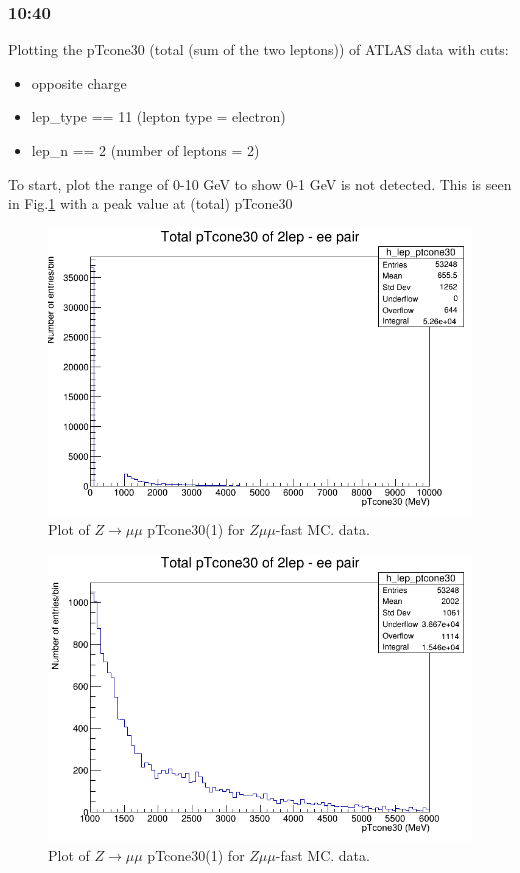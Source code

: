 \subsubsection*{10:40}
Plotting the pTcone30 (total (sum of the two leptons)) of ATLAS data with cuts:
\begin{itemize}
    \item opposite charge
    \item lep\_type == 11 (lepton type = electron)
    \item lep\_n == 2 (number of leptons = 2)
\end{itemize}
To start, plot the range of 0-10 GeV to show 0-1 GeV is not detected.  This is seen in Fig.\ref{fig:2lep_fast_ee-pair_pTcone30(total)_0-10GeV_16-02-21_10-50} with a peak value at (total) pTcone30
\begin{figure}[h!]
    \centering
    \includegraphics[width=0.85\linewidth]{plots/16-02-2021/2lep_fast_ee-pair_pTcone30(total)_0-10GeV_16-02-21_10-50}
    \caption{Plot of  $Z \rightarrow \mu\mu$ pTcone30(1) for $Z\mu\mu$-fast MC.  data.}\label{fig:2lep_fast_ee-pair_pTcone30(total)_0-10GeV_16-02-21_10-50}
\end{figure}


\begin{figure}[h!]
    \centering
    \includegraphics[width=0.85\linewidth]{plots/16-02-2021/2lep_fast_ee-pair_pTcone30(total)_1-6GeV_16-02-21_10-59}
    \caption{Plot of  $Z \rightarrow \mu\mu$ pTcone30(1) for $Z\mu\mu$-fast MC.  data.}\label{fig:2lep_fast_ee-pair_pTcone30(total)_1-6GeV_16-02-21_10-59}
\end{figure}

